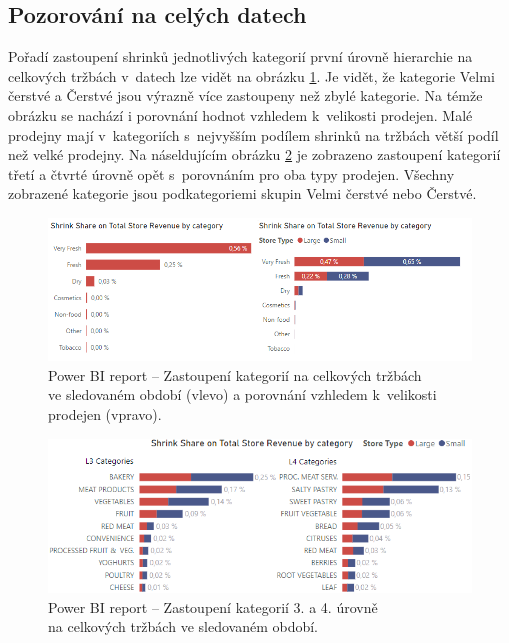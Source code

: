 \subsection*{Pozorování na celých datech}

Pořadí zastoupení shrinků jednotlivých kategorií první úrovně hierarchie na celkových tržbách v~datech lze vidět na obrázku \ref*{obr:PBI:vysL1}. Je vidět, že kategorie Velmi čerstvé a Čerstvé jsou výrazně více zastoupeny než zbylé kategorie. Na témže obrázku se nachází i porovnání hodnot vzhledem k~velikosti prodejen. 
Malé prodejny mají v~kategoriích s~nejvyšším podílem shrinků na tržbách větší podíl než velké prodejny.
Na náseldujícím obrázku \ref*{obr:PBI:vysL34} je zobrazeno zastoupení kategorií třetí a čtvrté úrovně opět s~porovnáním pro oba typy prodejen. Všechny zobrazené kategorie jsou podkategoriemi skupin Velmi čerstvé nebo Čerstvé.

\begin{figure}[h!]
    \centering
    \captionsetup{justification=centering}
    \includegraphics[width=\textwidth]{obrazky/PBI/vys_L1.png}
    \caption{Power BI report -- Zastoupení kategorií na celkových tržbách  \\ ve sledovaném období (vlevo) a porovnání vzhledem k~velikosti prodejen (vpravo).}
    \label{obr:PBI:vysL1}
\end{figure}

\begin{figure}[h!]
    \centering
    \captionsetup{justification=centering}
    \includegraphics[width=\textwidth]{obrazky/PBI/l3l4.png}
    \caption{Power BI report -- Zastoupení kategorií 3. a 4. úrovně \\na celkových tržbách ve sledovaném období.}
    \label{obr:PBI:vysL34}
\end{figure}


